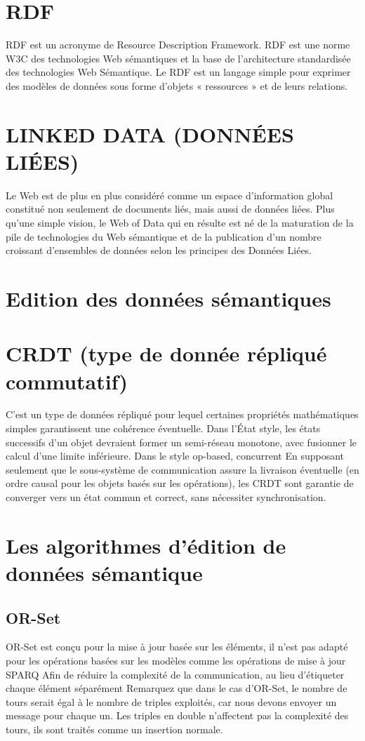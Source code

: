\documentclass[12pt]{report}
\begin{document}
\section{RDF}
RDF est un acronyme de Resource Description Framework. RDF est une norme W3C des technologies Web sémantiques et la base de l’architecture standardisée des technologies Web Sémantique. Le RDF est un langage simple pour exprimer des modèles de données sous forme d'objets « ressources » et de leurs relations.
\section{LINKED DATA (DONNÉES LIÉES)}
Le Web est de plus en plus considéré comme un espace d’information global constitué non seulement de documents liés, mais aussi de données liées. Plus qu’une simple vision, le Web of Data qui en résulte est né de la maturation de la pile de technologies du Web sémantique et de la publication d’un nombre croissant d’ensembles de données selon les principes des Données Liées.\cite{LDOW}
\section{Edition des données sémantiques}
\section{CRDT (type de donnée répliqué commutatif)}
C'est un type de données répliqué pour lequel certaines propriétés mathématiques simples garantissent une cohérence éventuelle. Dans l’État style, les états successifs d’un objet devraient former un semi-réseau monotone, avec fusionner le calcul d’une limite inférieure. Dans le style op-based, concurrent En supposant seulement que le sous-système de communication assure la livraison éventuelle (en ordre causal pour les objets basés sur les opérations), les CRDT sont garantie de converger vers un état commun et correct, sans nécessiter synchronisation.
\section{Les algorithmes d'édition de données sémantique}
\subsection{OR-Set}
OR-Set est conçu pour la mise à jour basée sur les éléments, il n’est pas adapté pour les opérations basées sur les modèles comme les opérations de mise à jour SPARQ  Afin de réduire la complexité de la communication, au lieu d’étiqueter chaque élément séparément Remarquez que dans le cas d’OR-Set, le nombre de tours serait égal à le nombre de triples exploités, car nous devons envoyer un message pour chaque un. Les triples en double n’affectent pas la complexité des tours, ils sont traités comme un insertion normale.
\end{document}

